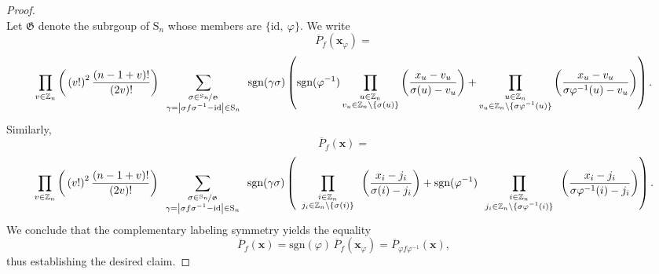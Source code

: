 \begin{proof}
\[\]
Let $\mathfrak{G}$ denote the subrgoup of $\text{S}_n$ whose members are $\big\{\text{id},\ \varphi\big\}$. We write
\[
\overline{P}_f(\mathbf{x}_\varphi)=
\]
\[
\prod_{v\in\mathbb{Z}_{n}}\bigg(\left(v!\right)^{2}\frac{\left(n-1+v\right)!}{\left(2v\right)!}\bigg)\sum_{\begin{array}{c}
\substack{\sigma\in\nicefrac{\text{S}_{n}}{\mathfrak{G}}\\
\gamma=\left|\sigma f\sigma^{-1}-\text{id}\right|\in\text{S}_{n}
}
\end{array}}\text{sgn}(\gamma\sigma)\left(\text{sgn}(\varphi^{-1})\prod_{\substack{u\in\mathbb{Z}_{n}\\
v_{u}\in\mathbb{Z}_{n}\backslash\{\sigma(u)\}
}
}\bigg(\frac{x_{u}-v_{u}}{\sigma(u)-v_{u}}\bigg)+\prod_{\substack{u\in\mathbb{Z}_{n}\\
v_{u}\in\mathbb{Z}_{n}\backslash\{\sigma\varphi^{-1}(u)\}
}
}\bigg(\frac{x_{u}-v_{u}}{\sigma\varphi^{-1}(u)-v_{u}}\bigg)\right).
\]
Similarly, 
\[
\overline{P}_f(\mathbf{x})=
\]
\[
\prod_{v\in\mathbb{Z}_{n}}\bigg(\left(v!\right)^{2}\frac{\left(n-1+v\right)!}{\left(2v\right)!}\bigg)\sum_{\begin{array}{c}
\substack{\sigma\in\nicefrac{\text{S}_{n}}{\mathfrak{G}}\\
\gamma=\left|\sigma f\sigma^{-1}-\text{id}\right|\in\text{S}_{n}
}
\end{array}}\text{sgn}(\gamma\sigma)\left(\prod_{\begin{array}{c}
\substack{i\in\mathbb{Z}_{n}\\
j_{i}\in\mathbb{Z}_{n}\backslash\{\sigma(i)\}
}
\end{array}}\bigg(\frac{x_{i}-j_{i}}{\sigma(i)-j_{i}}\bigg)+\text{sgn}(\varphi^{-1})\prod_{\begin{array}{c}
\substack{i\in\mathbb{Z}_{n}\\
j_{i}\in\mathbb{Z}_{n}\backslash\{\sigma\varphi^{-1}(i)\}
}
\end{array}}\bigg(\frac{x_{i}-j_{i}}{\sigma\varphi^{-1}(i)-j_{i}}\bigg)\right).
\]
We conclude that the complementary labeling symmetry yields the equality
\[
\overline{P}_f(\mathbf{x})=\text{sgn}(\varphi)\,\overline{P}_f(\mathbf{x}_{\varphi})=\overline{P}_{\varphi f\varphi^{-1}}(\mathbf{x}),
\]
thus establishing the desired claim.
\end{proof}

